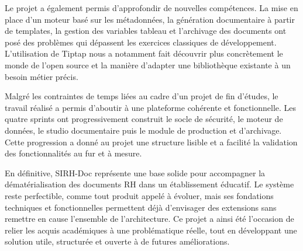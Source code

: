 Le projet a également permis d'approfondir de nouvelles compétences. La mise en place d'un moteur basé sur les métadonnées, la génération documentaire à partir de templates, la gestion des variables tableau et l'archivage des documents ont posé des problèmes qui dépassent les exercices classiques de développement. L'utilisation de Tiptap nous a notamment fait découvrir plus concrètement le monde de l'open source et la manière d'adapter une bibliothèque existante à un besoin métier précis.

Malgré les contraintes de temps liées au cadre d'un projet de fin d'études, le travail réalisé a permis d'aboutir à une plateforme cohérente et fonctionnelle. Les quatre sprints ont progressivement construit le socle de sécurité, le moteur de données, le studio documentaire puis le module de production et d'archivage. Cette progression a donné au projet une structure lisible et a facilité la validation des fonctionnalités au fur et à mesure.

En définitive, SIRH-Doc représente une base solide pour accompagner la dématérialisation des documents RH dans un établissement éducatif. Le système reste perfectible, comme tout produit appelé à évoluer, mais ses fondations techniques et fonctionnelles permettent déjà d'envisager des extensions sans remettre en cause l'ensemble de l'architecture. Ce projet a ainsi été l'occasion de relier les acquis académiques à une problématique réelle, tout en développant une solution utile, structurée et ouverte à de futures améliorations.
